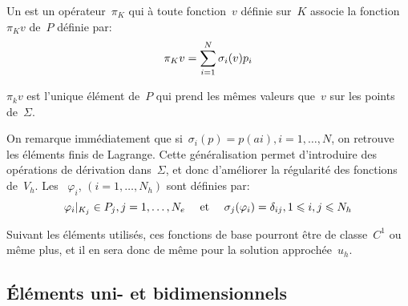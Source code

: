 \medskip
\begin{definition}
Un  est un opérateur~$\pi_K$ qui à toute fonction~$v$ définie sur~$K$ associe la fonction~$\pi_Kv$ de~$P$ définie par:
\begin{equation}
\pi_Kv=\displaystyle\sum_{i=1}^N \sigma_i(v)p_i
\end{equation}
\end{definition}
\begin{theoreme}
$\pi_kv$ est l'unique élément de~$P$ qui prend les mêmes valeurs que~$v$ sur les points de~$\Sigma$.
\end{theoreme}
\medskip
On remarque immédiatement que si~$\sigma_i(p) = p(ai), i=1,\ldots, N$, on retrouve les éléments finis de Lagrange. Cette généralisation permet d'introduire des opérations de dérivation dans~$\Sigma$, et donc d'améliorer la régularité des fonctions de~$V_h$.
\medskip
Les ~$\varphi_i$, $(i=1,\ldots, N_h)$ sont
définies par:
\begin{equation}
\varphi_i|_{K_j} \in P_j, j=1,\ldots, N_e \quad \text{ et } \quad \colorred
\sigma_j(\varphi_i)=\delta_{ij}, 1\le i,j\le N_h
\end{equation}

Suivant les éléments utilisés, ces fonctions de base pourront être de classe~$C^1$ ou même plus, et il en sera donc de même pour la solution approchée~$u_h$.


\medskip
\subsection{Éléments uni- et bidimensionnels}


